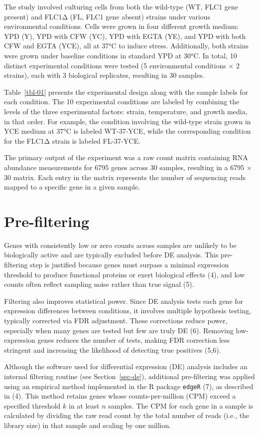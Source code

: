 \documentclass[
  a4paper,
]{scrreprt}
\begin{document}
The study involved culturing cells from both the wild-type (WT, FLC1
gene present) and FLC1Δ (FL, FLC1 gene absent) strains under various
environmental conditions. Cells were grown in four different growth
medium: YPD (Y), YPD with CFW (YC), YPD with EGTA (YE), and YPD with
both CFW and EGTA (YCE), all at 37°C to induce stress. Additionally,
both strains were grown under baseline conditions in standard YPD at
30°C. In total, 10 distinct experimental conditions were tested (5
environmental conditions × 2 strains), each with 3 biological
replicates, resulting in 30 samples.

Table~\ref{tbl-01} presents the experimental design along with the
sample labels for each condition. The 10 experimental conditions are
labeled by combining the levels of the three experimental factors:
strain, temperature, and growth media, in that order. For example, the
condition involving the wild-type strain grown in YCE medium at 37°C is
labeled WT-37-YCE, while the corresponding condition for the FLC1Δ
strain is labeled FL-37-YCE.

The primary output of the experiment was a raw count matrix containing
RNA abundance measurements for 6795 genes across 30 samples, resulting
in a 6795 × 30 matrix. Each entry in the matrix represents the number of
sequencing reads mapped to a specific gene in a given sample.

\section{Pre-filtering}\label{sec-filter}

Genes with consistently low or zero counts across samples are unlikely
to be biologically active and are typically excluded before DE analysis.
This pre-filtering step is justified because genes must surpass a
minimal expression threshold to produce functional proteins or exert
biological effects (4), and low counts often reflect sampling noise
rather than true signal (5).

Filtering also improves statistical power. Since DE analysis tests each
gene for expression differences between conditions, it involves multiple
hypothesis testing, typically corrected via FDR adjustment. These
corrections reduce power, especially when many genes are tested but few
are truly DE (6). Removing low-expression genes reduces the number of
tests, making FDR correction less stringent and increasing the
likelihood of detecting true positives (5,6).

Although the software used for differential expression (DE) analysis
includes an internal filtering routine (see Section~\ref{sec-de}),
additional pre-filtering was applied using an empirical method
implemented in the R package \texttt{edgeR} (7), as described in (4).
This method retains genes whose counts-per-million (CPM) exceed a
specified threshold \(k\) in at least \(n\) samples. The CPM for each
gene in a sample is calculated by dividing the raw read count by the
total number of reads (i.e., the library size) in that sample and
scaling by one million.
\end{document}
